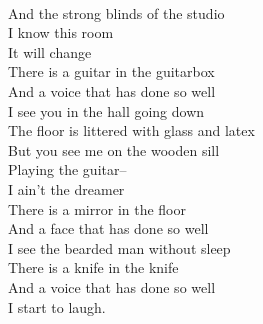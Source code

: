 \documentclass[smalldemyvopaper,11pt,twoside,onecolumn,openright,extrafontsizes]{memoir}
\begin{document}
\\And the strong blinds of the studio
\\I know this room
\\It will change
\\There is a guitar in the guitarbox
\\And a voice that has done so well
\\I see you in the hall going down
\\The floor is littered with glass and latex
\\But you see me on the wooden sill
\\Playing the guitar--
\\I ain't the dreamer
\\There is a mirror in the floor
\\And a face that has done so well
\\I see the bearded man without sleep
\\There is a knife in the knife
\\And a voice that has done so well
\\I start to laugh.
\end{document}

